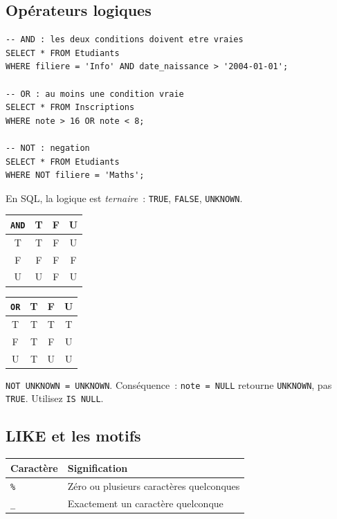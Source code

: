 \subsection{Op\'erateurs logiques}

\begin{codeblock}[title=\textbf{Combinaison de conditions}]
\begin{verbatim}
-- AND : les deux conditions doivent etre vraies
SELECT * FROM Etudiants
WHERE filiere = 'Info' AND date_naissance > '2004-01-01';

-- OR : au moins une condition vraie
SELECT * FROM Inscriptions
WHERE note > 16 OR note < 8;

-- NOT : negation
SELECT * FROM Etudiants
WHERE NOT filiere = 'Maths';
\end{verbatim}
\end{codeblock}

\begin{attention}[title=\textbf{Logique ternaire et NULL}]
En SQL, la logique est \emph{ternaire}~: \texttt{TRUE}, \texttt{FALSE}, \texttt{UNKNOWN}.
\begin{center}
\begin{tabular}{c|ccc}
\texttt{AND} & T & F & U \\
\hline
T & T & F & U \\
F & F & F & F \\
U & U & F & U \\
\end{tabular}
\qquad
\begin{tabular}{c|ccc}
\texttt{OR} & T & F & U \\
\hline
T & T & T & T \\
F & T & F & U \\
U & T & U & U \\
\end{tabular}
\end{center}
\texttt{NOT UNKNOWN = UNKNOWN}. Cons\'equence~: \texttt{note = NULL}
retourne \texttt{UNKNOWN}, pas \texttt{TRUE}. Utilisez \texttt{IS NULL}.
\end{attention}

\subsection{LIKE et les motifs}

\begin{formules}[title=\textbf{Caract\`eres sp\'eciaux de LIKE}]
\begin{center}
\begin{tabular}{ll}
\toprule
\textbf{Caract\`ere} & \textbf{Signification} \\
\midrule
\texttt{\%} & Z\'ero ou plusieurs caract\`eres quelconques \\
\texttt{\_} & Exactement un caract\`ere quelconque \\
\bottomrule
\end{tabular}
\end{center}
\end{formules}

